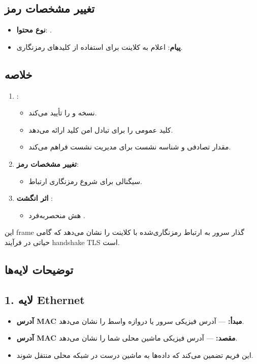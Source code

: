 \subsection*{تغییر مشخصات رمز}
\begin{itemize}
    \item \textbf{نوع محتوا}: .
    \item \textbf{پیام}: اعلام به کلاینت برای استفاده از کلیدهای رمزنگاری.
\end{itemize}

\subsection*{خلاصه}
\begin{enumerate}
    \item \textbf{}: 
    \begin{itemize}
        \item نسخه  و  را تأیید می‌کند.
        \item کلید عمومی را برای تبادل امن کلید ارائه می‌دهد.
        \item مقدار تصادفی و شناسه نشست برای مدیریت نشست فراهم می‌کند.
    \end{itemize}
    \item \textbf{تغییر مشخصات رمز}:
    \begin{itemize}
        \item سیگنالی برای شروع رمزنگاری ارتباط.
    \end{itemize}
    \item \textbf{اثر انگشت }:
    \begin{itemize}
        \item هش منحصربه‌فرد .
    \end{itemize}
\end{enumerate}

این frame گذار سرور به ارتباط رمزنگاری‌شده با کلاینت را نشان می‌دهد که گامی حیاتی در فرآیند handshake TLS است.
\subsection*{}
\subsection*{توضیحات لایه‌ها}

\subsection*{1. لایه Ethernet}
\begin{itemize}
    \item \textbf{آدرس MAC مبدأ:}  — آدرس فیزیکی سرور یا دروازه واسط را نشان می‌دهد.
    \item \textbf{آدرس MAC مقصد:}  — آدرس فیزیکی ماشین محلی شما را نشان می‌دهد.
    \item این فریم تضمین می‌کند که داده‌ها به ماشین درست در شبکه محلی منتقل شوند.
\end{itemize}

